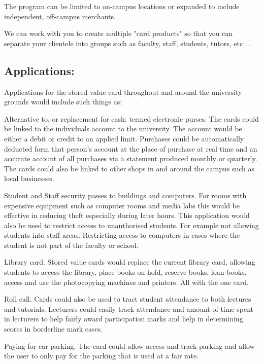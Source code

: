 \subitems The program can be limited to on-campus locations or expanded to
include independent, off-campus merchants.

\subitems We can work with you to create multiple "card products" so that you
can separate your clientele into groups such as faculty, staff, students,
tutors, etc $\ldots$

\subsection{Applications:}

Applications for the stored value card throughout and around the university
grounds would include such things as:

\items Alternative to, or replacement for cash: termed electronic purses. The
cards could be linked to the individuals account to the university. The account
would be either a debit or credit to an applied limit. Purchases could be
automatically deducted form that person's account at the place of purchase at
real time and an accurate account of all purchases via a statement produced
monthly or quarterly. The cards could also be linked to other shops in and
around the campus such as local businesses.   

\subitems Student and Staff security passes to buildings and computers. For
rooms with expensive equipment such as computer rooms and media labs this would
be effective in reducing theft especially during later hours. This application
would also be used to restrict access to unauthorised students. For example not
allowing students into staff areas. Restricting access to computers in cases
where the student is not part of the faculty or school.      

\subitems Library card. Stored value cards would replace the current library
card, allowing students to access the library, place books on hold, reserve
books, loan books, access and use the photocopying machines and printers. All
with the one card.

\subitems Roll call. Cards could also be used to tract student attendance to
both lectures and tutorials. Lecturers could easily track attendance and
amount of time spent in lecturers to help fairly award participation marks and
help in determining scores in borderline mark cases.    

\subitems Paying for car parking. The card could allow access and track
parking and allow the user to only pay for the parking that is used at a fair
rate. 

